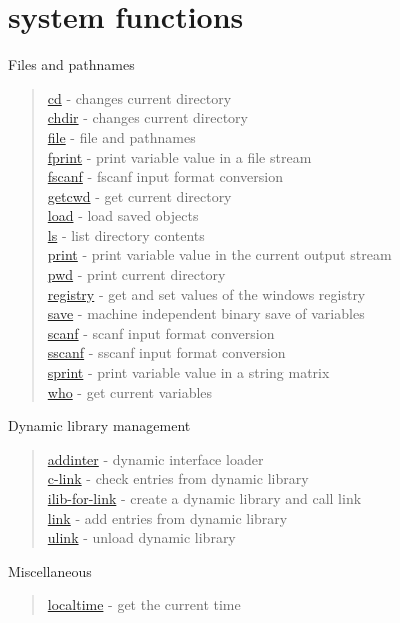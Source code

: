 \chapter*{system functions}

Files and pathnames
\begin{quote}
\noindent
\hyperlink{cd}{cd} - {changes current directory} \\ %
\hyperlink{chdir}{chdir} - {changes current directory} \\ %
\hyperlink{file}{file} - file and pathnames\\
\hyperlink{fprint}{fprint} - print variable value in a file stream\\
\hyperlink{fscanf}{fscanf} - fscanf input format conversion \\
\hyperlink{getcwd}{getcwd} - {get current directory} \\
\hyperlink{load}{load} - load saved objects\\
\hyperlink{ls}{ls} - {list directory contents} \\ %
\hyperlink{print}{print} - print variable value  in the current output stream\\
\hyperlink{pwd}{pwd} - {print current directory} \\ %
\hyperlink{registry}{registry} - get and set values of the windows registry\\
\hyperlink{save}{save} - machine independent binary save of variables\\
\hyperlink{scanf}{scanf} - scanf input format conversion \\
\hyperlink{sscanf}{sscanf} - sscanf input format conversion \\
\hyperlink{sprint}{sprint} - print variable value in a string matrix \\
\hyperlink{who}{who} - get current variables\\
\end{quote}

Dynamic library management
\begin{quote}
\noindent 
\hyperlink{addinter}{addinter} - dynamic interface loader\\
\hyperlink{c_link}{c-link} - check entries from dynamic library \\
\hyperlink{ilib_for_link}{ilib-for-link} - create a dynamic library and call link \\
\hyperlink{link}{link} - add entries from dynamic library \\
\hyperlink{ulink}{ulink} - unload dynamic library \\
\end{quote}

Miscellaneous 
\begin{quote}
\noindent 
\hyperlink{localtime}{localtime} - {get the current time}
\end{quote}



  
  

 

 

 
 
 
